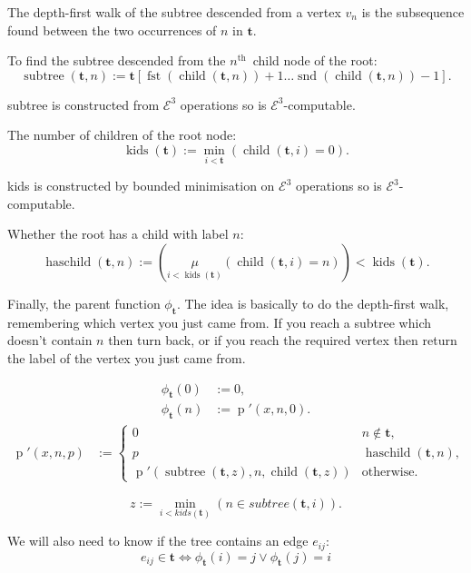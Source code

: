 \documentclass[a4paper]{article}
\newcommand{\grz}[1]{$\mathcal{E}^{#1}$}	%
\newcommand{\least}[2]{\underset{#1}{\mu}\left( #2 \right)}	%
\newcommand{\nth}{$n^{\textrm{th}}$~}	%
\newcommand{\tvec}{\mathbf{t}}	%
\newcommand{\recur}[1]{\begin{equation} \begin{split} #1 \end{split} \end{equation}}	%
\newcommand{\recurN}[1]{\begin{equation*} \begin{split} #1 \end{split} \end{equation*}}	%
\theoremstyle{plain}
\theoremstyle{definition}
\begin{document}
The depth-first walk of the subtree descended from a vertex $v_n$ is the subsequence found between the two occurrences of $n$ in $\tvec$. 

To find the subtree descended from the \nth child node of the root:
\begin{equation} \operatorname{subtree}(\tvec,n) := \tvec[\operatorname{fst}(\operatorname{child}(\tvec,n))+1 \dots \operatorname{snd}(\operatorname{child}(\tvec,n))-1]. \end{equation}

subtree is constructed from \grz{3} operations so is \grz{3}-computable.

The number of children of the root node:
\begin{equation} \operatorname{kids}(\tvec) := \min_{i < \tvec} (\operatorname{child}(\tvec,i)=0). \end{equation}

kids is constructed by bounded minimisation on \grz{3} operations so is \grz{3}-computable.

Whether the root has a child with label $n$:
\begin{equation} \operatorname{haschild}(\tvec,n) :=  \left( \least{i < \operatorname{kids}(\tvec)}{\operatorname{child}(\tvec,i)=n} \right) < \operatorname{kids}(\tvec). \end{equation}

Finally, the parent function $\phi_{\tvec}$. The idea is basically to do the depth-first walk, remembering which vertex you just came from. If you reach a subtree which doesn't contain $n$ then turn back, or if you reach the required vertex then return the label of the vertex you just came from.

\recur{
\phi_{\tvec}(0) &:= 0, \\
\phi_{\tvec}(n) &:= \operatorname{p}'(x,n,0).
}
\recurN{
\operatorname{p}'(x,n,p) &:= \begin{cases}
						0 & n \not \in \tvec, \\
						p & \operatorname{haschild}(\tvec,n), \\
						\operatorname{p}'(\operatorname{subtree}(\tvec,z),n,\operatorname{child}(\tvec,z)) & \textrm{otherwise.}
					\end{cases}
}

\begin{equation*} z := \min_{i < kids(\tvec)}(n \in subtree(\tvec,i)). \end{equation*}

We will also need to know if the tree contains an edge $e_{ij}$:
\begin{equation} e_{ij} \in \tvec \Leftrightarrow \phi_{\tvec}(i) = j \vee \phi_{\tvec}(j) = i \end{equation}
\end{document}
